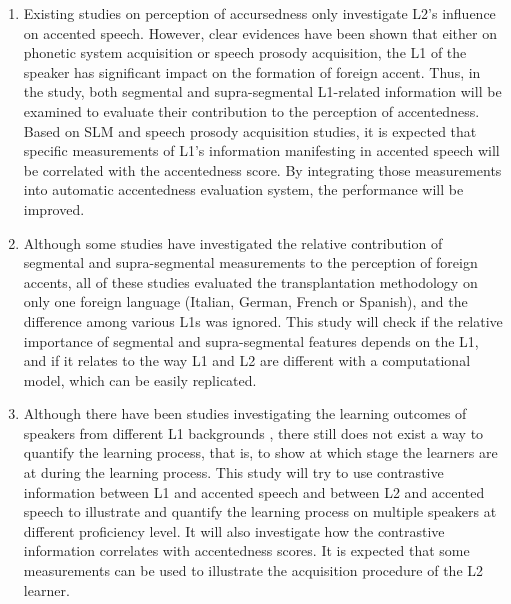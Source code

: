 \begin{enumerate}
\item Existing studies on perception of accursedness only investigate L2's influence on accented speech. However, clear evidences have been shown that either on phonetic system acquisition or speech prosody acquisition, the L1 of the speaker has significant impact on the formation of foreign accent. Thus, in the study, both segmental and supra-segmental L1-related information will be examined to evaluate their contribution to the perception of accentedness. Based on SLM and speech prosody acquisition studies, it is expected that specific measurements of L1's information manifesting in accented speech will be correlated with the accentedness score. By integrating those measurements into automatic accentedness evaluation system, the performance will be improved.
\item Although some studies have investigated the relative contribution of segmental and supra-segmental measurements to the perception of foreign accents, all of these studies evaluated the transplantation methodology on only one foreign language (Italian, German, French or Spanish), and the difference among various L1s was ignored. This study will check if the relative importance of segmental and supra-segmental features depends on the L1, and if it relates to the way L1 and L2 are different with a computational model, which can be easily replicated.
\item Although there have been studies investigating the learning outcomes of speakers from different L1 backgrounds \citep{li2014l2,white2007calibrating}, there still does not exist a way to quantify the learning process, that is, to show at which stage the learners are at during the learning process. This study will try to use contrastive information between L1 and accented speech and between L2 and accented speech to illustrate and quantify the learning process on multiple speakers at different proficiency level. It will also investigate how the contrastive information correlates with accentedness scores. It is expected that some measurements can be used to illustrate the acquisition procedure of the L2 learner.
\end{enumerate}

